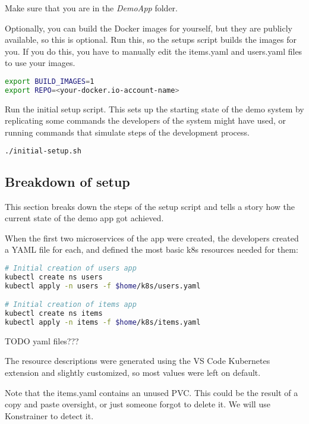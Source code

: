 Make sure that you are in the \emph{DemoApp} folder.

Optionally, you can build the Docker images for yourself, but they are publicly available, so this is optional. Run this, so the setups script builds the images for you. If you do this, you have to manually edit the items.yaml and users.yaml files to use your images.

\begin{lstlisting}[caption={Optional: Build images},language=bash,label=code:bash1]
export BUILD_IMAGES=1
export REPO=<your-docker.io-account-name>
\end{lstlisting}

Run the initial setup script. This sets up the starting state of the demo system by replicating some commands the developers of the system might have used, or running commands that simulate steps of the development process.

\begin{lstlisting}[caption={Run the setup script},language=bash,label=code:bash2]
./initial-setup.sh
\end{lstlisting}


\subsection{Breakdown of setup}

This section breaks down the steps of the setup script and tells a story how the current state of the demo app got achieved.

When the first two microservices of the app were created, the developers created a YAML file for each, and defined the most basic k8s resources needed for them:

\begin{lstlisting}[caption={Create first deployment},language=bash,label=code:bash3]
# Initial creation of users app
kubectl create ns users
kubectl apply -n users -f $home/k8s/users.yaml

# Initial creation of items app
kubectl create ns items
kubectl apply -n items -f $home/k8s/items.yaml
\end{lstlisting}

TODO yaml files???

The resource descriptions were generated using the VS Code Kubernetes extension and slightly customized, so most values were left on default.

Note that the items.yaml contains an unused PVC. This could be the result of a copy and paste oversight, or just someone forgot to delete it. We will use Konstrainer to detect it.

